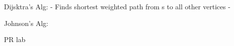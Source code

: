 Dijsktra's Alg:
- Finds shortest weighted path from s to all other vertices
- 

Johnson's Alg:

PR lab 